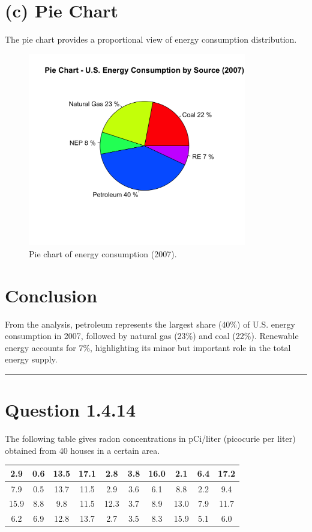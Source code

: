\documentclass[12pt]{article}
\begin{document}
\section*{(c) Pie Chart}
The pie chart provides a proportional view of energy consumption distribution.

\begin{figure}[H]
\centering
\includegraphics[width=0.85\textwidth]{1.4.3_c_pie_chart.png}
\caption{Pie chart of energy consumption (2007).}
\end{figure}

\section*{Conclusion}
From the analysis, petroleum represents the largest share (40\%) of U.S. energy consumption in 2007, followed by natural gas (23\%) and coal (22\%). Renewable energy accounts for 7\%, highlighting its minor but important role in the total energy supply.

\noindent\rule{\textwidth}{0.4pt} %




\section*{Question 1.4.14}
The following table gives radon concentrations in pCi/liter (picocurie per liter) obtained from 40 houses in a certain area.

\begin{table}[h!]
\centering
\renewcommand{\arraystretch}{1.2}
\begin{tabular}{|c|c|c|c|c|c|c|c|c|c|}
\hline
2.9 & 0.6 & 13.5 & 17.1 & 2.8 & 3.8 & 16.0 & 2.1 & 6.4 & 17.2 \\ \hline
7.9 & 0.5 & 13.7 & 11.5 & 2.9 & 3.6 & 6.1 & 8.8 & 2.2 & 9.4 \\ \hline
15.9 & 8.8 & 9.8 & 11.5 & 12.3 & 3.7 & 8.9 & 13.0 & 7.9 & 11.7 \\ \hline
6.2 & 6.9 & 12.8 & 13.7 & 2.7 & 3.5 & 8.3 & 15.9 & 5.1 & 6.0 \\ \hline
\end{tabular}
\end{table}
\end{document}
